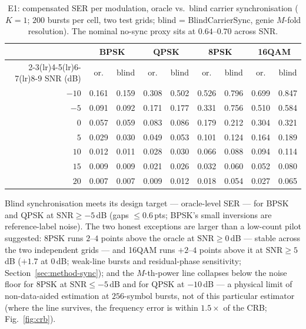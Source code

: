 \documentclass[journal]{IEEEtran}
\newcommand{\snr}{\mathrm{SNR}}
\begin{document}
\begin{table}[!t]
\centering
\caption{E1: compensated SER per modulation, oracle vs.\ blind carrier
synchronisation ($K{=}1$; $200$ bursts per cell, two test grids; blind
= BlindCarrierSync, genie $M$-fold resolution).
The nominal no-sync proxy sits at $0.64$--$0.70$ across SNR.}
\label{tab:e1}
\scriptsize
\setlength{\tabcolsep}{3pt}
\begin{tabular}{rcccccccc}
\toprule
& \multicolumn{2}{c}{BPSK} & \multicolumn{2}{c}{QPSK}
& \multicolumn{2}{c}{8PSK} & \multicolumn{2}{c}{16QAM} \\
\cmidrule(lr){2-3}\cmidrule(lr){4-5}\cmidrule(lr){6-7}\cmidrule(lr){8-9}
SNR (dB) & or. & blind & or. & blind & or. & blind & or. & blind \\
\midrule
$-10$ & 0.161 & 0.159 & 0.308 & 0.502 & 0.526 & 0.796 & 0.699 & 0.847 \\
$-5$  & 0.091 & 0.092 & 0.171 & 0.177 & 0.331 & 0.756 & 0.510 & 0.584 \\
$0$   & 0.057 & 0.059 & 0.083 & 0.086 & 0.179 & 0.212 & 0.304 & 0.321 \\
$5$   & 0.029 & 0.030 & 0.049 & 0.053 & 0.101 & 0.124 & 0.164 & 0.189 \\
$10$  & 0.012 & 0.011 & 0.028 & 0.030 & 0.066 & 0.088 & 0.094 & 0.114 \\
$15$  & 0.009 & 0.009 & 0.021 & 0.026 & 0.032 & 0.060 & 0.052 & 0.080 \\
$20$  & 0.007 & 0.007 & 0.009 & 0.012 & 0.018 & 0.054 & 0.027 & 0.065 \\
\bottomrule
\end{tabular}
\end{table}

Blind synchronisation meets its design target --- oracle-level SER ---
for BPSK and QPSK at $\snr \geq -5$\,dB (gaps $\leq 0.6$\,pts; BPSK's
small inversions are reference-label noise). The two honest exceptions
are larger than a low-count pilot suggested: 8PSK runs $2$--$4$ points
above the oracle
at $\snr \geq 0$\,dB --- stable across the two independent grids ---
and 16QAM runs $+2$--$4$ points above it at $\snr \geq 5$\,dB
($+1.7$ at $0$\,dB; weak-line bursts and
residual-phase sensitivity; Section~\ref{sec:method-sync}); and the
$M$-th-power line collapses below the noise
floor for 8PSK at $\snr \leq -5$\,dB and for QPSK at $-10$\,dB --- a
physical limit of non-data-aided estimation at $256$-symbol bursts, not
of this particular estimator (where the line survives, the frequency
error is within $1.5\times$ of the CRB;
Fig.~\ref{fig:crb}).
\end{document}
